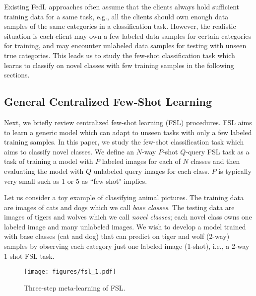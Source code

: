 Existing FedL approaches often assume that the clients
always hold sufficient training data for a same task, e.g., all the clients should own enough data samples of the same categories in a classification task.
However, the realistic situation is each client may own a few labeled data samples for certain categories for training, and may encounter unlabeled data samples for testing with unseen true categories. This leads us to study the few-shot classification task which learns to classify on novel classes with few training samples in the following sections.
 
 




\subsection{General Centralized Few-Shot Learning}
\label{sec:fsl}
Next, we briefly review centralized few-shot learning (FSL) procedures. FSL aims to learn a generic model which can adapt to 
unseen tasks with only a few labeled training samples. In this paper, we study the few-shot classification task which aims to classify novel classes.  We define an $N$-way $P$-shot $Q$-query FSL task as a task of training a model with $P$ labeled images for each of $N$ classes and then
evaluating the model with $Q$ unlabeled query images for each class. $P$ is typically very small such as 1 or 5 as ``few-shot" implies.

Let us consider a toy example of classifying animal pictures. The training data are images of cats and dogs which we call \textit{base classes}. The testing data are images of tigers and wolves which we call \textit{novel classes}; each novel class owns one labeled image and many unlabeled images.
We wish to develop a model trained with base classes (cat and dog) that can predict on tiger and wolf (2-way) samples by observing each category just one labeled image (1-shot), i.e., a 2-way 1-shot FSL task. 


\begin{figure}
\begin{center}
\texttt{[image: figures/fsl\_1.pdf]}
\end{center}
\vspace{-10pt}
\caption{Three-step meta-learning of FSL. 
}\label{fig:fsl_1}
\vspace{-12pt}
\end{figure}


